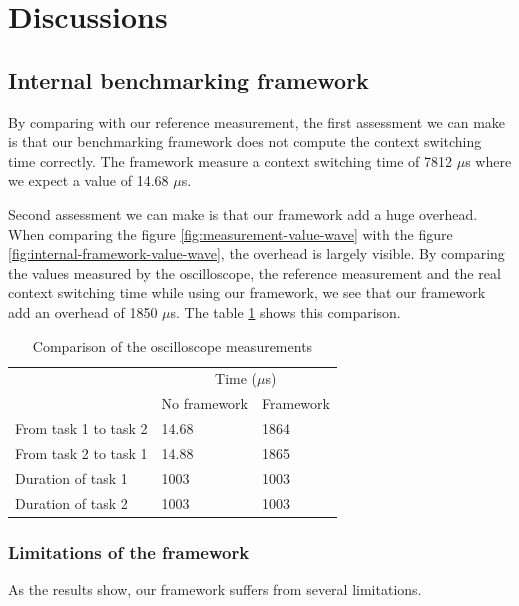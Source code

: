 \section{Discussions}

\subsection{Internal benchmarking framework}

By comparing with our reference measurement, the first assessment we can make is that our benchmarking framework does not compute the context switching time correctly.
The framework measure a context switching time of 7812 $\mu$s where we expect a value of 14.68 $\mu$s.

Second assessment we can make is that our framework add a huge overhead.
When comparing the figure \ref{fig:measurement-value-wave} with the figure \ref{fig:internal-framework-value-wave}, the overhead is largely visible.
By comparing the values measured by the oscilloscope, the reference measurement and the real context switching time while using our framework, we see that our framework add an overhead of 1850 $\mu$s.
The table \ref{tab:measurements-comparison} shows this comparison.

\begin{table}[!ht]
  \centering
  \begin{tabular}{lll}
                        & \multicolumn{2}{c}{Time ($\mu$s)}                                     \\ \cline{2-3} 
                        & \multicolumn{1}{c}{No framework} & Framework \\ \cline{2-3} 
  From task 1 to task 2 & 14.68                                     & 1864                  \\
  From task 2 to task 1 & 14.88                                     & 1865                  \\
  Duration of task 1    & 1003                                      & 1003                  \\
  Duration of task 2    & 1003                                      & 1003                 
  \end{tabular}
  \caption{Comparison of the oscilloscope measurements}
  \label{tab:measurements-comparison}
\end{table}

\subsubsection{Limitations of the framework}
As the results show, our framework suffers from several limitations.

